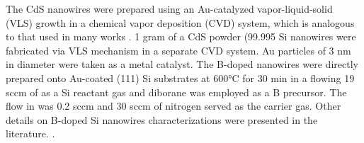 The CdS nanowires were prepared using an Au-catalyzed vapor-liquid-solid (VLS) growth  in a chemical vapor deposition (CVD) system, which is analogous to that used in many works \cite{zhang2014photosensing,577926461}. 1 gram of a CdS powder (99.995 %
Si nanowires were fabricated via VLS mechanism in a separate CVD system. Au particles of 3 nm in diameter were taken as a metal catalyst. The B-doped nanowires were directly prepared onto Au-coated (111) Si substrates at 600°C for 30 min in a flowing 19 sccm of  as a Si reactant gas and diborane  was employed as a B precursor. The  flow in  was 0.2 sccm and 30 sccm of nitrogen  served as the carrier gas. Other details on B-doped Si nanowires characterizations were presented in the literature. \cite{577926462,577926464,577926465}.

